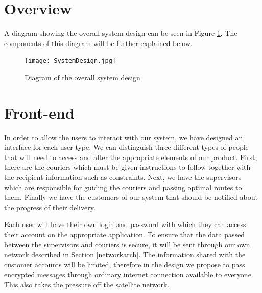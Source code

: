 
\section{Overview}

A diagram showing the overall system design can be seen in Figure \ref{fig:SystemDesign}. The components of this diagram will be further explained below.

\begin{figure}[h]
\texttt{[image: SystemDesign.jpg]}
    \centering
    \caption{Diagram of the overall system design}
    \label{fig:SystemDesign}
\end{figure}

\section{Front-end} \label{frontendarch}
In order to allow the users to interact with our system, we have designed an interface for each user type. We can distinguish three different types of people that will need to access and alter the appropriate elements of our product. First, there are the couriers which must be given instructions to follow together with the recipient information such as constraints. Next, we have the supervisors which are responsible for guiding the couriers and passing optimal routes to them. Finally we have the customers of our system that should be notified about the progress of their delivery.

Each user will have their own login and password with which they can access their account on the appropriate application. To ensure that the data passed between the supervisors and couriers is secure, it will be sent through our own network described in Section \ref{networkarch}. The information shared with the customer accounts will be limited, therefore in the design we propose to pass encrypted messages through ordinary internet connection available to everyone. This also takes the pressure off the satellite network.

